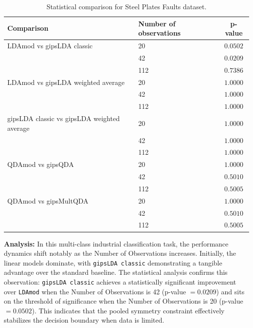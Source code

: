 \documentclass[a4paper,11pt,twoside]{report}
\theoremstyle{definition}
\begin{document}
\begin{table}[H]
    \centering
    \begin{tabular}{llc}
        \toprule
        \textbf{Comparison} & \textbf{Number of observations} & \textbf{p-value} \\
        \midrule
        LDAmod vs gipsLDA classic & 20 & $0.0502$ \\
                                  & 42 & $0.0209$ \\
                                  & 112 & $0.7386$ \\
        \midrule
        LDAmod vs gipsLDA weighted average & 20 & $1.0000$ \\
                                           & 42 & $1.0000$ \\
                                           & 112 & $1.0000$ \\
        \midrule
        gipsLDA classic vs gipsLDA weighted average & 20 & $1.0000$ \\
                                                    & 42 & $1.0000$ \\
                                                    & 112 & $1.0000$ \\
        \midrule
        QDAmod vs gipsQDA & 20 & $1.0000$ \\
                          & 42 & $0.5010$ \\
                          & 112 & $0.5005$ \\
        \midrule
        QDAmod vs gipsMultQDA & 20 & $1.0000$ \\
                              & 42 & $0.5010$ \\
                              & 112 & $0.5005$ \\
        \bottomrule
    \end{tabular}
    \caption{Statistical comparison for Steel Plates Faults dataset.}
\end{table}

\textbf{Analysis:}
In this multi-class industrial classification task, the performance dynamics shift notably as the Number of Observations increases. Initially, the linear models dominate, with \texttt{gipsLDA classic} demonstrating a tangible advantage over the standard baseline. The statistical analysis confirms this observation: \texttt{gipsLDA classic} achieves a statistically significant improvement over \texttt{LDAmod} when the Number of Observations is 42 (p-value $= 0.0209$) and sits on the threshold of significance when the Number of Observations is 20 (p-value $= 0.0502$). This indicates that the pooled symmetry constraint effectively stabilizes the decision boundary when data is limited.
\end{document}
